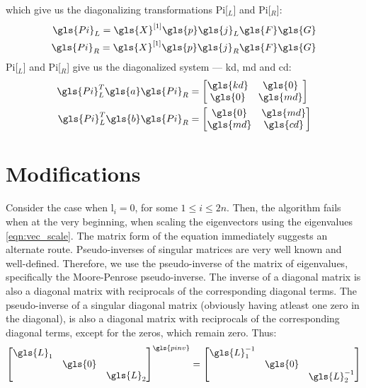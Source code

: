 which give us the diagonalizing transformations \gls{Pi}[$_L$] and \gls{Pi}[$_R$]:
\begin{subequations}
\begin{align}
	\gls{Pi}_L = \gls{X}^{[1]}\gls{p}\gls{j}_L\gls{F}\gls{G}\\
	\gls{Pi}_R = \gls{X}^{[1]}\gls{p}\gls{j}_R\gls{F}\gls{G}
\end{align}
\end{subequations}
\gls{Pi}[$_L$] and \gls{Pi}[$_R$] give us the diagonalized system --- \gls{kd},
\gls{md} and \gls{cd}:
\begin{subequations}
\label{eqn:decoupled}
\begin{align}
	\gls{Pi}_L^T\gls{a}\gls{Pi}_R &= \begin{bmatrix}
	\gls{kd} & \gls{0} \\
	\gls{0} & \gls{md}\\
	\end{bmatrix}\\
	\gls{Pi}_L^T\gls{b}\gls{Pi}_R &= \begin{bmatrix}
	\gls{0} & \gls{md} \\
	\gls{md} & \gls{cd}\\
	\end{bmatrix}
\end{align}
\end{subequations}

\section{Modifications}
Consider the case when \gls{l}$_i = 0$, for some $ 1\leq i \leq 2n$. Then, 
the algorithm fails when at the very beginning, when scaling the 
eigenvectors using the eigenvalues \eqref{eqn:vec_scale}. The matrix form 
of the equation immediately suggests an alternate route. Pseudo-inverses of 
singular matrices are very well known and well-defined. Therefore, we use 
the pseudo-inverse of the matrix of eigenvalues, specifically the Moore-Penrose 
pseudo-inverse. The inverse of a diagonal matrix is also a diagonal 
matrix with reciprocals of the corresponding diagonal terms. The 
pseudo-inverse of a singular diagonal matrix (obviously having atleast one 
zero in the diagonal), is also a diagonal matrix with reciprocals of the 
corresponding diagonal terms, except for the zeros, which remain zero. 
Thus:
\begin{align}
	{\begin{bmatrix}
		\gls{L}_1 & & \\		 
		 & \gls{0} & \\
		 & & \gls{L}_2	
	\end{bmatrix}}^{\gls{pinv}} = 
	\begin{bmatrix}
		\gls{L}_1^{-1} & & \\		 
		 & \gls{0} & \\
		 & & \gls{L}_2^{-1}	
	\end{bmatrix}
\end{align}

